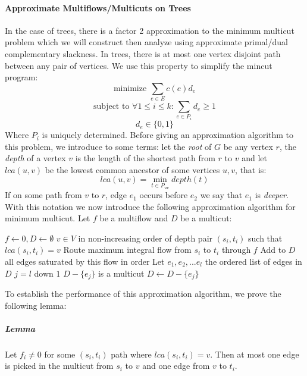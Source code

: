 \documentclass{article}
\begin{document}
\paragraph{Approximate Multiflows/Multicuts on Trees}
In the case of trees, there is a factor 2 approximation to the minimum multicut problem which we will construct then analyze using approximate primal/dual complementary slackness.  In trees, there is at most one vertex disjoint path between any pair of vertices.  We use this property to simplify the mincut program:
\[ \textrm{minimize } \sum \limits_{e \in E} c(e) d_e \]
\[ \textrm{subject to } \forall 1 \leq i \leq k  : \sum \limits_{e \in P_i} d_e \geq 1 \]
\[ d_e \in \{ 0, 1 \} \]
Where $P_i$ is uniquely determined.  Before giving an approximation algorithm to this problem, we introduce to some terms:  let the \emph{root} of $G$ be any vertex $r$, the \emph{depth} of a vertex $v$ is the length of the shortest path from $r$ to $v$ and let $lca(u,v)$ be the lowest common ancestor of some vertices $u,v$, that is:
\[ lca(u, v) = \min_{t \in P_{uv}} depth(t) \]
If on some path from $v$ to $r$, edge $e_1$ occurs before $e_2$ we say that $e_1$ is \emph{deeper}.  With this notation we now introduce the following approximation algorithm for minimum multicut.  Let $f$ be a multiflow and $D$ be a multicut:
\begin{codebox}
\li $f \gets 0, D \gets \emptyset$
\li \For {} $v \in V$ in non-increasing order of depth
\li		\Do \For {} pair $(s_i, t_i)$ such that $lca(s_i, t_i) = v$
\li			\Do Route maximum integral flow from $s_i$ to $t_i$ through $f$
\li			Add to $D$ all edges saturated by this flow in order
			\End
		\End
\li Let $e_1, e_2, ... e_l$ the ordered list of edges in $D$
\li \For $j = l$ down \To $1$
\li		\Do \If $D - \{ e_j \}$ is a multicut
\li			\Then $D \gets D - \{ e_j \}$
			\End
		\End
\end{codebox}
To establish the performance of this approximation algorithm, we prove the following lemma:
\subparagraph{Lemma} Let $f_i \neq 0$ for some $(s_i, t_i)$ path where $lca(s_i, t_i) = v$.  Then at most one edge is picked in the multicut from $s_i$ to $v$ and one edge from $v$ to $t_i$.
\end{document}
